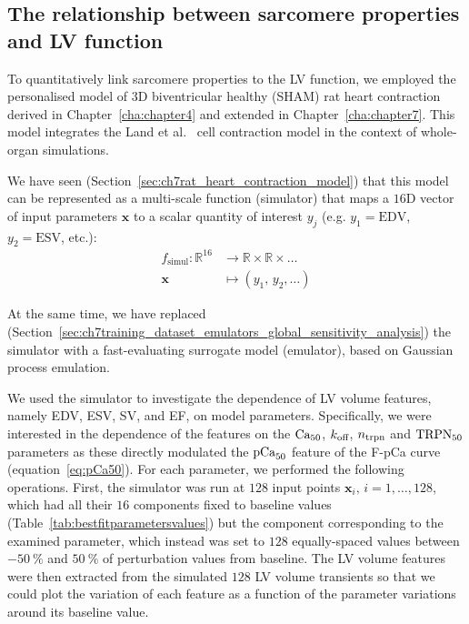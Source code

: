 %
%
%
\subsection{The relationship between sarcomere properties and LV function}\label{subsec:quantlink}
To quantitatively link sarcomere properties to the LV function, we employed the personalised model of $3$D biventricular healthy (SHAM) rat heart contraction derived in Chapter~\ref{cha:chapter4} and extended in Chapter~\ref{cha:chapter7}. This model integrates the Land et al.~\cite{Land:2012} cell contraction model in the context of whole-organ simulations.

\vspace{0.2cm}
We have seen (Section~\ref{sec:ch7rat_heart_contraction_model}) that this model can be represented as a multi-scale function (simulator) that maps a $16$D vector of input parameters $\mathbf{x}$ to a scalar quantity of interest $y_j$ (e.g. $y_1=\textrm{EDV}$, $y_2=\textrm{ESV}$, etc.):
%
\begin{align}\label{eq:fsimul}
    f_{\textrm{simul}}\colon\mathbb{R}^{16} &\to\mathbb{R}\times\mathbb{R}\times\dots \\
    \mathbf{x} &\mapsto (y_1,\,y_2,\dots) \nonumber
\end{align}

\vspace{0.2cm}\noindent
At the same time, we have replaced (Section~\ref{sec:ch7training_dataset_emulators_global_sensitivity_analysis}) the simulator with a fast-evaluating surrogate model (emulator), based on Gaussian process emulation.

\vspace{0.2cm}
We used the simulator to investigate the dependence of LV volume features, namely EDV, ESV, SV, and EF, on model parameters. Specifically, we were interested in the dependence of the features on the $\textrm{Ca}_{50}$, $k_{\textrm{off}}$, $n_{\textrm{trpn}}$ and $\textrm{TRPN}_{50}$ parameters as these directly modulated the $\textrm{pCa}_{50}$ feature of the F-pCa curve (equation~\eqref{eq:pCa50}). For each parameter, we performed the following operations. First, the simulator was run at $128$ input points $\mathbf{x}_i,\,i=1,\dots,128$, which had all their $16$ components fixed to baseline values (Table~\ref{tab:bestfitparametersvalues}) but the component corresponding to the examined parameter, which instead was set to $128$ equally-spaced values between $-\SI{50}{\percent}$ and $\SI{50}{\percent}$ of perturbation values from baseline. The LV volume features were then extracted from the simulated $128$ LV volume transients so that we could plot the variation of each feature as a function of the parameter variations around its baseline value.


